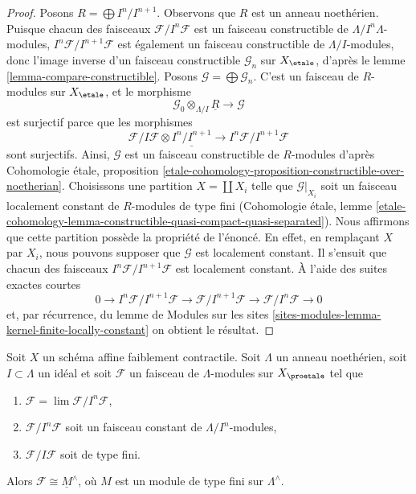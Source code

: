 \begin{proof}
Posons $R = \bigoplus I^n/I^{n + 1}$. Observons que $R$ est un anneau noethérien.
Puisque chacun des faisceaux
$\mathcal{F}/I^n\mathcal{F}$ est un faisceau constructible de
$\Lambda/I^n\Lambda$-modules, $I^n\mathcal{F}/I^{n + 1}\mathcal{F}$
est également un faisceau constructible de $\Lambda/I$-modules, donc l'image inverse
d'un faisceau constructible $\mathcal{G}_n$ sur $X_\etale$, d'après le
lemme \ref{lemma-compare-constructible}.
Posons $\mathcal{G} = \bigoplus \mathcal{G}_n$. C'est un faisceau
de $R$-modules sur $X_\etale$, et le morphisme
$$
\mathcal{G}_0 \otimes_{\Lambda/I} \underline{R}
\longrightarrow
\mathcal{G}
$$
est surjectif parce que les morphismes
$$
\mathcal{F}/I\mathcal{F} \otimes \underline{I^n/I^{n + 1}} \to
I^n\mathcal{F}/I^{n + 1}\mathcal{F}
$$
sont surjectifs. Ainsi, $\mathcal{G}$ est un faisceau constructible de
$R$-modules d'après Cohomologie \'etale, proposition
\ref{etale-cohomology-proposition-constructible-over-noetherian}.
Choisissons une partition $X = \coprod X_i$ telle que
$\mathcal{G}|_{X_i}$ soit un faisceau localement constant de $R$-modules
de type fini (Cohomologie \'etale, lemme
\ref{etale-cohomology-lemma-constructible-quasi-compact-quasi-separated}).
Nous affirmons que cette partition possède la propriété de l'énoncé.
En effet, en remplaçant $X$ par $X_i$, nous pouvons supposer que $\mathcal{G}$ est localement
constant. Il s'ensuit que chacun des faisceaux
 $I^n\mathcal{F}/I^{n + 1}\mathcal{F}$
est localement constant. À l'aide des suites exactes courtes
$$
0 \to I^n\mathcal{F}/I^{n + 1}\mathcal{F} \to
\mathcal{F}/I^{n + 1}\mathcal{F} \to \mathcal{F}/I^n\mathcal{F} \to 0
$$
et, par récurrence, du lemme de Modules sur les sites
\ref{sites-modules-lemma-kernel-finite-locally-constant}
on obtient le résultat.
\end{proof}

\begin{lemma}
\label{lemma-weird}
Soit $X$ un schéma affine faiblement contractile. Soit $\Lambda$ un anneau noethérien,
soit $I \subset \Lambda$ un idéal et soit $\mathcal{F}$ un faisceau de
$\Lambda$-modules sur $X_\proetale$ tel que
\begin{enumerate}
\item $\mathcal{F} = \lim \mathcal{F}/I^n\mathcal{F}$,
\item $\mathcal{F}/I^n\mathcal{F}$ soit un faisceau constant de
$\Lambda/I^n$-modules,
\item $\mathcal{F}/I\mathcal{F}$ soit de type fini.
\end{enumerate}
Alors $\mathcal{F} \cong \underline{M}^\wedge$, où $M$ est
un module de type fini sur $\Lambda^\wedge$.
\end{lemma}

